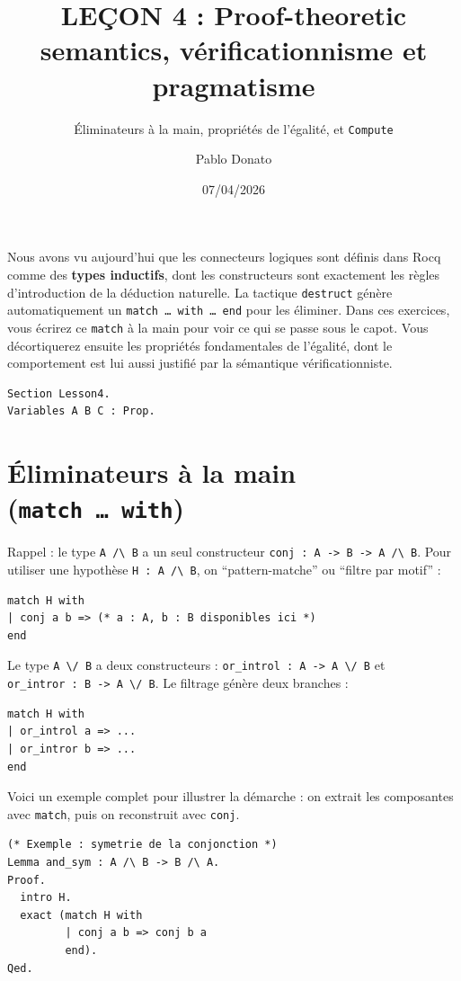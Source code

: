 \documentclass[11pt,a4paper]{article}
\title{LEÇON 4 : Proof-theoretic semantics, vérificationnisme et pragmatisme}
\subtitle{Éliminateurs à la main, propriétés de l'égalité, et \texttt{Compute}}
\date{07/04/2026}
\author{Pablo Donato}
\makeatletter
\let\oldmaketitle\maketitle
\renewcommand{\maketitle}{%
  \let\oldtitle\@title
  \renewcommand{\@title}{\oldtitle\\[1em]\Large\normalfont\@subtitle}%
  \oldmaketitle
}
\makeatother
\begin{document}
\maketitle

Nous avons vu aujourd'hui que les connecteurs logiques sont définis dans Rocq comme des \textbf{types inductifs}, dont les constructeurs sont exactement les règles d'introduction de la déduction naturelle. La tactique \texttt{destruct} génère automatiquement un \texttt{match~\dots~with~\dots~end} pour les éliminer. Dans ces exercices, vous écrirez ce \texttt{match} à la main pour voir ce qui se passe sous le capot. Vous décortiquerez ensuite les propriétés fondamentales de l'égalité, dont le comportement est lui aussi justifié par la sémantique vérificationniste.

\begin{lstlisting}
Section Lesson4.
Variables A B C : Prop.
\end{lstlisting}

\section{Éliminateurs à la main (\texttt{match~\dots~with})}

Rappel : le type \texttt{A /\textbackslash{} B} a un seul constructeur \texttt{conj~:~A~->~B~->~A~/\textbackslash{}~B}. Pour utiliser une hypothèse \texttt{H~:~A~/\textbackslash{}~B}, on ``pattern-matche'' ou ``filtre par motif'' :

\begin{lstlisting}
match H with
| conj a b => (* a : A, b : B disponibles ici *)
end
\end{lstlisting}

Le type \texttt{A \textbackslash{}/ B} a deux constructeurs : \texttt{or\_introl~:~A~->~A~\textbackslash{}/~B} et \texttt{or\_intror~:~B~->~A~\textbackslash{}/~B}. Le filtrage génère deux branches :

\begin{lstlisting}
match H with
| or_introl a => ...
| or_intror b => ...
end
\end{lstlisting}

Voici un exemple complet pour illustrer la démarche : on extrait les composantes avec \texttt{match}, puis on reconstruit avec \texttt{conj}.

\begin{lstlisting}
(* Exemple : symetrie de la conjonction *)
Lemma and_sym : A /\ B -> B /\ A.
Proof.
  intro H.
  exact (match H with
         | conj a b => conj b a
         end).
Qed.
\end{lstlisting}
\end{document}
